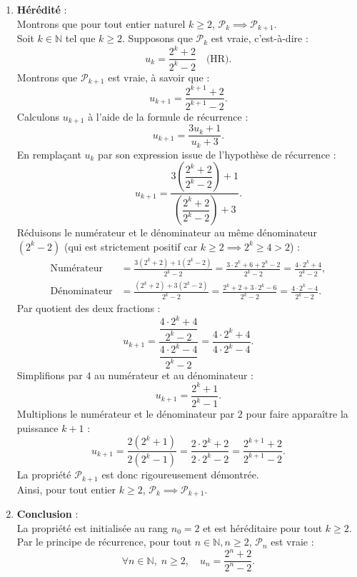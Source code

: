 \documentclass[11pt,a4paper]{article}
\newcommand{\N}{\mathbb{N}}
\begin{document}
\begin{correctionbox}
\begin{enumerate}[label=\textbf{\arabic*.}]
    \item \textbf{Hérédité} :\\
    Montrons que pour tout entier naturel $k \ge 2$, $\mathcal{P}_k \implies \mathcal{P}_{k+1}$.\\
    Soit $k \in \N$ tel que $k \ge 2$. Supposons que $\mathcal{P}_k$ est vraie, c'est-à-dire :
    \[
    u_k = \frac{2^k + 2}{2^k - 2} \quad \text{(HR)}.
    \]
    Montrons que $\mathcal{P}_{k+1}$ est vraie, à savoir que :
    \[
    u_{k+1} = \frac{2^{k+1} + 2}{2^{k+1} - 2}.
    \]
    Calculons $u_{k+1}$ à l'aide de la formule de récurrence :
    \[
    u_{k+1} = \frac{3u_k + 1}{u_k + 3}.
    \]
    En remplaçant $u_k$ par son expression issue de l'hypothèse de récurrence :
    \[
    u_{k+1} = \frac{3 \left(\dfrac{2^k + 2}{2^k - 2}\right) + 1}{\left(\dfrac{2^k + 2}{2^k - 2}\right) + 3}.
    \]
    Réduisons le numérateur et le dénominateur au même dénominateur $(2^k - 2)$ (qui est strictement positif car $k \ge 2 \implies 2^k \ge 4 > 2$) :
    \begin{align*}
    \text{Numérateur} &= \frac{3(2^k + 2) + 1(2^k - 2)}{2^k - 2} = \frac{3 \cdot 2^k + 6 + 2^k - 2}{2^k - 2} = \frac{4 \cdot 2^k + 4}{2^k - 2}, \\
    \text{Dénominateur} &= \frac{(2^k + 2) + 3(2^k - 2)}{2^k - 2} = \frac{2^k + 2 + 3 \cdot 2^k - 6}{2^k - 2} = \frac{4 \cdot 2^k - 4}{2^k - 2}.
    \end{align*}
    Par quotient des deux fractions :
    \[
    u_{k+1} = \frac{\dfrac{4 \cdot 2^k + 4}{2^k - 2}}{\dfrac{4 \cdot 2^k - 4}{2^k - 2}} = \frac{4 \cdot 2^k + 4}{4 \cdot 2^k - 4}.
    \]
    Simplifions par $4$ au numérateur et au dénominateur :
    \[
    u_{k+1} = \frac{2^k + 1}{2^k - 1}.
    \]
    Multiplions le numérateur et le dénominateur par $2$ pour faire apparaître la puissance $k+1$ :
    \[
    u_{k+1} = \frac{2(2^k + 1)}{2(2^k - 1)} = \frac{2 \cdot 2^k + 2}{2 \cdot 2^k - 2} = \frac{2^{k+1} + 2}{2^{k+1} - 2}.
    \]
    La propriété $\mathcal{P}_{k+1}$ est donc rigoureusement démontrée.\\
    Ainsi, pour tout entier $k \ge 2$, $\mathcal{P}_k \implies \mathcal{P}_{k+1}$.

    \item \textbf{Conclusion} :\\
    La propriété est initialisée au rang $n_0 = 2$ et est héréditaire pour tout $k \ge 2$. Par le principe de récurrence, pour tout $n \in \N, n \ge 2$, $\mathcal{P}_n$ est vraie :
    \[
    \forall n \in \N, \; n \ge 2, \quad u_n = \frac{2^n + 2}{2^n - 2}.
    \]
\end{enumerate}
\end{correctionbox}
\end{document}
